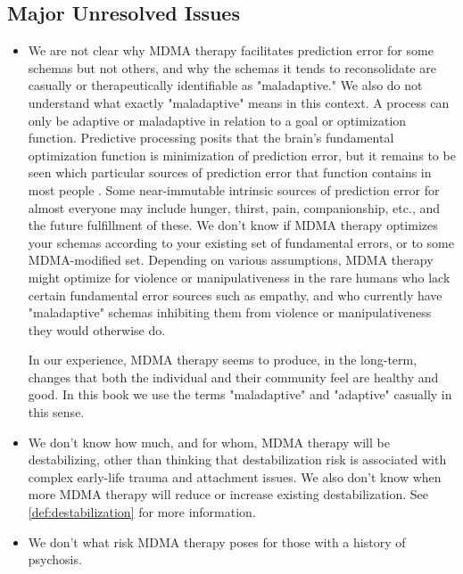 \documentclass[12pt,letterpaper]{book}
\begin{document}
\subsection*{Major Unresolved Issues}
\begin{itemize}
    \item We are not clear why MDMA therapy facilitates prediction error for some schemas but not others, and why the schemas it tends to reconsolidate are casually or therapeutically identifiable as "maladaptive." We also do not understand what exactly "maladaptive" means in this context. A process can only be adaptive or maladaptive in relation to a goal or optimization function. Predictive processing posits that the brain's fundamental optimization function is minimization of prediction error, but it remains to be seen which particular sources of prediction error that function contains in most people \cite{clark2015surfing}. Some near-immutable intrinsic sources of prediction error for almost everyone may include hunger, thirst, pain, companionship, etc., and the future fulfillment of these. We don't know if MDMA therapy optimizes your schemas according to your existing set of fundamental errors, or to some MDMA-modified set. Depending on various assumptions, MDMA therapy might optimize for violence or manipulativeness in the rare humans who lack certain fundamental error sources such as empathy, and who currently have "maladaptive" schemas inhibiting them from violence or manipulativeness they would otherwise do.
    
    In our experience, MDMA therapy seems to produce, in the long-term, changes that both the individual and their community feel are healthy and good. In this book we use the terms "maladaptive" and "adaptive" casually in this sense.
    \item We don't know how much, and for whom, MDMA therapy will be destabilizing, other than thinking that destabilization risk is associated with complex early-life trauma and attachment issues. We also don't know when more MDMA therapy will reduce or increase existing destabilization. See \ref{def:destabilization} for more information.
    \item We don't what risk MDMA therapy poses for those with a history of psychosis.
\end{itemize}
\end{document}
